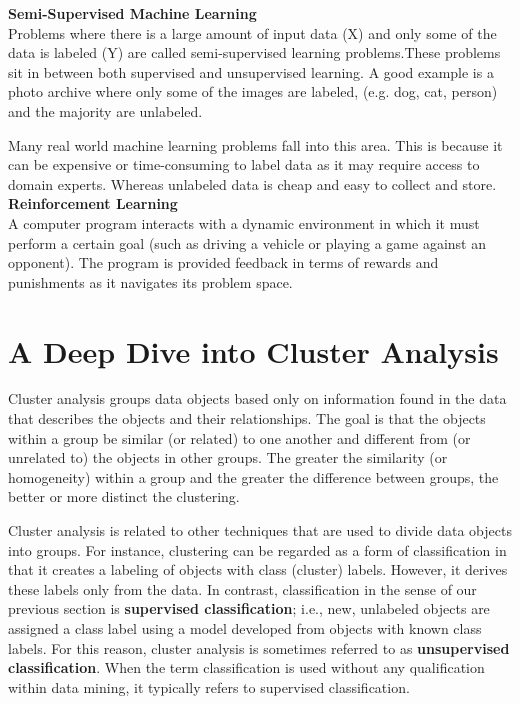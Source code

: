 \textbf{Semi-Supervised Machine Learning}\\
Problems where there is a large amount of input data (X) and only some of the data is labeled
(Y) are called semi-supervised learning problems.These problems sit in between both supervised
and unsupervised learning. A good example is a photo archive where only some of the
images are labeled, (e.g. dog, cat, person) and the majority are unlabeled.

Many real world machine learning problems fall into this area. This is because it can be
expensive or time-consuming to label data as it may require access to domain experts. Whereas
unlabeled data is cheap and easy to collect and store.\\

\textbf{Reinforcement Learning}\\
A computer program interacts with a dynamic environment in which it must perform a certain
goal (such as driving a vehicle or playing a game against an opponent). The program is provided
feedback in terms of rewards and punishments as it navigates its problem space.

\section{A Deep Dive into Cluster Analysis}
Cluster analysis groups data objects based only on information found in the
data that describes the objects and their relationships.  The goal is that the
objects within a group be similar (or related) to one another and different from
(or unrelated to) the objects in other groups.  The greater the similarity (or
homogeneity) within a group and the greater the difference between groups,
the better or more distinct the clustering.

Cluster analysis is related to other techniques that are used to divide data
objects into groups.  For instance, clustering can be regarded as a form of
classification in that it creates a labeling of objects with class (cluster) labels.
However, it derives these labels only from the data. In contrast, classification
in the sense of our previous section is \textbf{supervised classification}; i.e.,
new, unlabeled objects are assigned a class label using a model developed from objects with
known class labels. For this reason, cluster analysis is sometimes referred to as
\textbf{unsupervised classification}. When the term classification is used
without any qualification within data mining, it typically refers to supervised
classification.

